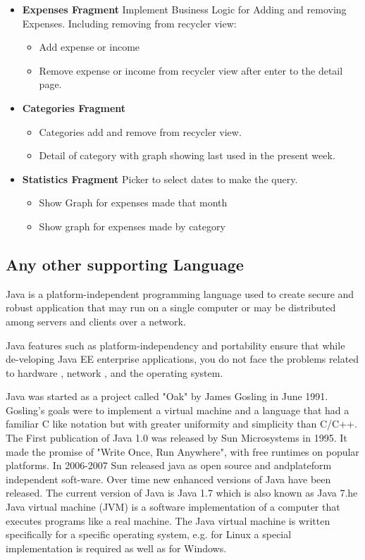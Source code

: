 \begin{itemize}
	\item \textbf{Expenses Fragment}
Implement Business Logic for Adding and removing Expenses. Including removing from
recycler view:
\begin{itemize}
	\item Add expense or income
\item Remove expense or income from recycler view after enter to the detail page.
\end{itemize}

\item \textbf{Categories Fragment}
\begin{itemize}
	\item Categories add and remove from recycler view.
\item Detail of category with graph showing last used in the present week.
\end{itemize}



\item \textbf{Statistics Fragment}
Picker to select dates to make the query.
\begin{itemize}
	\item Show Graph for expenses made that month
\item Show graph for expenses made by category
\end{itemize}



\end{itemize}

\subsection{Any other supporting Language}
Java is a platform-independent programming language used to create secure
and robust application that may run on a single computer or may be distributed
among servers and clients over a network.

Java features such as platform-independency and portability ensure that while
de-veloping Java EE enterprise applications, you do not face the problems
related to hardware , network , and the operating system.

Java was started as a project called "Oak" by James Gosling in June 1991.
Gosling's goals were to implement a virtual machine and a language that had a
familiar C like notation but with greater uniformity and simplicity than C/C++.
The First publication of Java 1.0 was released by Sun Microsystems in 1995. It
made the promise of "Write Once, Run Anywhere", with free runtimes on
popular platforms. In 2006-2007 Sun released java as open source and
andplateform independent soft-ware. Over time new enhanced versions of Java
have been released. The current version of Java is Java 1.7 which is also
known as Java 7.he Java virtual machine (JVM) is a software implementation of
a computer that executes programs like a real machine. The Java virtual
machine is written specifically for a specific operating system, e.g. for Linux a
special implementation is required as well as for Windows.

